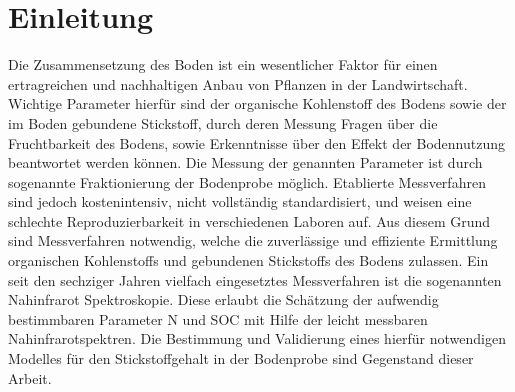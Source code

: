 \section{Einleitung}
\label{sec:Einleitung}

    Die Zusammensetzung des Boden ist ein wesentlicher Faktor für einen ertragreichen und nachhaltigen Anbau von Pflanzen in der Landwirtschaft.
    Wichtige Parameter hierfür sind der organische Kohlenstoff des Bodens sowie der im Boden gebundene Stickstoff, durch deren Messung Fragen über die Fruchtbarkeit des Bodens, sowie Erkenntnisse über den Effekt der Bodennutzung beantwortet werden können.\cite{Poeplau2013}
    Die Messung der genannten Parameter ist durch sogenannte Fraktionierung der Bodenprobe möglich.
    Etablierte Messverfahren sind jedoch kostenintensiv, nicht vollständig standardisiert, und weisen eine schlechte Reproduzierbarkeit in verschiedenen Laboren auf.\cite{Poeplau2013}
    Aus diesem Grund sind Messverfahren notwendig, welche die zuverlässige und effiziente Ermittlung organischen Kohlenstoffs und gebundenen Stickstoffs des Bodens zulassen.
    Ein seit den sechziger Jahren vielfach eingesetztes Messverfahren ist die sogenannten Nahinfrarot Spektroskopie. \cite{Agelet2010}
    Diese erlaubt die Schätzung der aufwendig bestimmbaren Parameter N und SOC mit Hilfe der leicht messbaren Nahinfrarotspektren.
    Die Bestimmung und Validierung eines hierfür notwendigen Modelles für den Stickstoffgehalt in der Bodenprobe sind Gegenstand dieser Arbeit.

	
